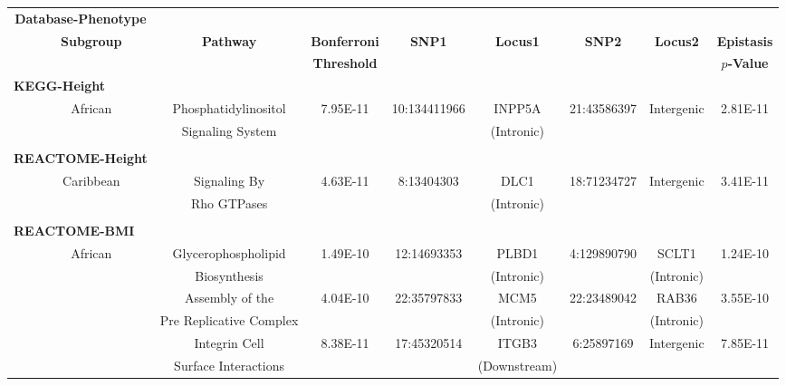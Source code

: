 \documentclass[10pt,a4paper]{article}
\begin{document}
\setlength{\footskip}{3.5cm}
\begin{landscape}
\begin{table}[ht]
\centering
\vspace{-1cm}
\hspace*{-2.5cm}
\begin{tabular}{ccccccccc}
  \hline
  \multicolumn{2}{c}{\textbf{Database-Phenotype}} & & & & & & & \\
  \cline{1-2}
  & \textbf{Subgroup} & \textbf{Pathway} & \textbf{Bonferroni} & \textbf{SNP1} & \textbf{Locus1} & \textbf{SNP2} & \textbf{Locus2} & \textbf{Epistasis} \\
  & & & \textbf{Threshold} & & & & & \textbf{$p$-Value}\\
  \hline
 \multicolumn{2}{l}{\textbf{KEGG-Height}} & & & & & & & \\
 & African & Phosphatidylinositol & 7.95E-11 & 10:134411966 & INPP5A & 21:43586397 & Intergenic & 2.81E-11 \\
 & & Signaling System & & & (Intronic) & & & \\
 & & & & & & & & \\
 \multicolumn{2}{l}{\textbf{REACTOME-Height}} & & & &  & & & \\
 & Caribbean & Signaling By & 4.63E-11 & 8:13404303 & DLC1 & 18:71234727 & Intergenic & 3.41E-11\\
 & & Rho GTPases & & & (Intronic) & & & \\
 & & & & & &  & & \\
 \multicolumn{2}{l}{\textbf{REACTOME-BMI}} & & &  & & & & \\
 & African & Glycerophospholipid & 1.49E-10 & 12:14693353 &  PLBD1 & 4:129890790 & SCLT1 & 1.24E-10 \\
 & & Biosynthesis & & & (Intronic) & & (Intronic) & \\
 & & Assembly of the & 4.04E-10 & 22:35797833 &  MCM5 & 22:23489042 & RAB36 & 3.55E-10 \\
 & & Pre Replicative Complex & & & (Intronic) & & (Intronic) & \\
 & & Integrin Cell & 8.38E-11 & 17:45320514 &  ITGB3 & 6:25897169  & Intergenic & 7.85E-11 \\
 & & Surface Interactions & & & (Downstream) & & & \\ 
   \hline
\end{tabular}

\end{table}
\end{landscape}
\end{document}
